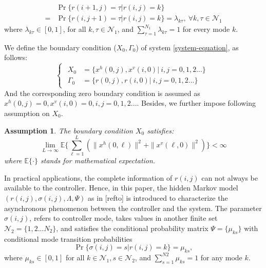 \documentclass[conference]{IEEEtran}
\newtheorem{assumption}{Assumption}
\begin{document}
	\begin{equation}
		\begin{split}
			&\Pr\{r(i+1,j)=\tau|r(i,j)=k\}\\
		    =&\Pr\{r(i,j+1)=\tau|r(i,j)=k\}=\lambda_{k\tau},\  \forall k,\tau \in \mathcal{N}_{1}
		\end{split}
	\end{equation}
	where $\lambda_{k\tau}\in[0,1]$, for all $k, \tau\in\mathcal{N}_{1}$, and $\sum_{\tau=1}^{N_1}\lambda_{k\tau}=1$ for every mode $k$.
	
	We define the boundary condition ($X_{0},\Gamma_{0}$) of system \eqref{system-equation}, as follows:
	\begin{equation} \label{boundary-condition}
	\left\{
		\begin{array}{lr}
			\begin{split}
				X_{0} &= \{x^{h}(0,j),x^{v}(i,0)|\ i,j = 0,1,2...\}\\
				\varGamma_{0} &= \{r(0,j), r(i,0)|\ i,j = 0,1,2... \}
			\end{split}
		\end{array}
	\right.
	\end{equation}
	And the corresponding zero boundary condition is assumed as $x^{h}(0,j) =0, x^{v}(i,0)=0, i,j =0,1,2...$. Besides, we further impose following assumption on $X_{0}$.
	
	\begin{assumption}\label{boundary-assumptin}
	 	The boundary condition $X_{0}$ satisfies:
	 	\begin{equation}
	 		\lim\limits_{L\to\infty}\mathbb{E}\Big\{\sum_{\ell=1}^{L}(\|x^{h}(0,\ell)\|^{2}+ \|x^{v}(\ell,0)\|^{2})\Big\} < \infty
	 	\end{equation}
	 	where $\mathbb{E}\{\cdot\}$ stands for mathematical expectation.
	\end{assumption}
	
	In practical applications, the complete information of $r(i,j)$ can not always be available to the controller. Hence, in this paper, the hidden Markov model $(r(i,j),\sigma(i,j),\varLambda,\varPsi)$ as in [refto] is introduced to characterize the asynchronous phenomenon between the controller and the system. The parameter $\sigma(i,j)$, refers to controller mode, takes values in another finite set $\mathcal{N}_{2} = \{1,2...N_{2}\}$, and satisfies the conditional probability matrix $\varPsi=\{\mu_{ks}\}$ with conditional mode transition probabilities
	\begin{equation}
		\Pr\{\sigma(i,j)=s|r(i,j)=k\}=\mu_{ks}, %
	\end{equation}
	where $\mu_{ks}\in[0,1]$ for all $k\in\mathcal{N}_{1}, s\in\mathcal{N}_{2}$, and $\sum_{s=1}^{N2}\mu_{ks} = 1$ for any mode $k$.
	
\end{document}

